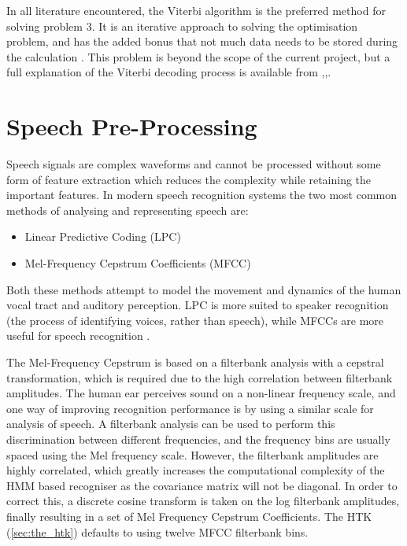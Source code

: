 		In all literature encountered, the Viterbi algorithm is the preferred method for solving problem 3.  It is an iterative approach to solving the optimisation problem, and has the added bonus that not much data needs to be stored during the calculation \cite{schuster2006speech}.  This problem is beyond the scope of the current project, but a full explanation of the Viterbi decoding process is available from \cite{rabiner1989tutorial},\cite{melnikoff2003speech},\cite{saeed2008advanced}.



\section{Speech Pre-Processing} %
\label{sec:speech_pre_processing}
	Speech signals are complex waveforms and cannot be processed without some form of feature extraction which reduces the complexity while retaining the important features.  In modern speech recognition systems the two most common methods of analysing and representing speech are: \cite{gaikwad2010review}
	\begin{itemize}
		\item Linear Predictive Coding (LPC)
		\item Mel-Frequency Cepstrum Coefficients (MFCC)
	\end{itemize}
	Both these methods attempt to model the movement and dynamics of the human vocal tract and auditory perception.  LPC is more suited to speaker recognition (the process of identifying voices, rather than speech), while MFCCs are more useful for speech recognition \cite{sd2012interview}.

	The Mel-Frequency Cepstrum is based on a filterbank analysis with a cepstral transformation, which is required due to the high correlation between filterbank amplitudes.  The human ear perceives sound on a non-linear frequency scale, and one way of improving recognition performance is by using a similar scale for analysis of speech.  A filterbank analysis can be used to perform this discrimination between different frequencies, and the frequency bins are usually spaced using the Mel frequency scale.  However, the filterbank amplitudes are highly correlated, which greatly increases the computational complexity of the HMM based recogniser as the covariance matrix will not be diagonal.  In order to correct this, a discrete cosine transform is taken on the log filterbank amplitudes, finally resulting in a set of Mel Frequency Cepstrum Coefficients.  The HTK (\ref{sec:the_htk}) defaults to using twelve MFCC filterbank bins. \cite{htkbook} \cite{melnikoff2003speech}

